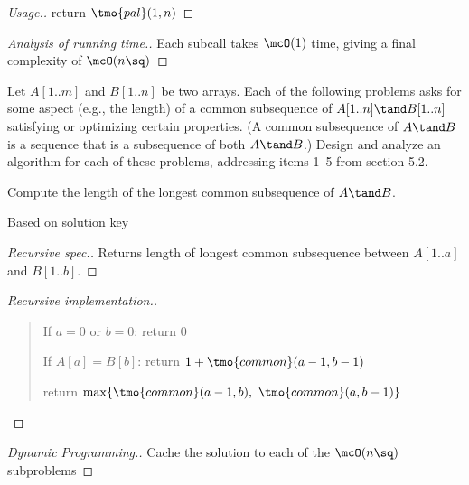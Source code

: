 \documentclass{article}
\begin{document}
\begin{proof}[Usage.]
  return $ \tmo{pal}(1,n) $
\end{proof}

\begin{proof}[Analysis of running time.]
  Each subcall takes $ \mcO(1) $ time, giving a final complexity of $ \mcO(n\sq) $
\end{proof}
\pagebreak

 Let $ A[1..m] $ and $ B[1..n] $ be two arrays. Each of the following problems asks for some aspect (e.g., the length) of a common subsequence of $A[1..n] \tand B[1..n]$ satisfying or optimizing certain properties. (A common subsequence of $A \tand B$ is a sequence that is a subsequence of both $A \tand B$.) Design and analyze an algorithm for each of these problems, addressing items 1--5 from section 5.2.
\setcounter{exercise}{2}
\setcounter{subexercise}{0}

\begin{subexercise} %
  Compute the length of the longest common subsequence of $A \tand B$.
\end{subexercise}

\begin{note}
  Based on solution key
\end{note}

\begin{proof}[Recursive spec.]
  Returns length of longest common subsequence between $ A[1..a] $ and $ B[1..b] $.
\end{proof}

\begin{proof}[Recursive implementation.]\
\begin{quote}
\begin{steps}
  \item If $ a=0 $ or $ b = 0 $: return 0
  \item If $ A[a] = B[b] $: return $ 1+\tmo{common}(a-1,b-1) $
  \item return $ \max \{\tmo{common}(a-1,b),\ \tmo{common}(a,b-1)\}$
\end{steps}
\end{quote}
\end{proof}

\begin{proof}[Dynamic Programming.]
Cache the solution to each of the $ \mcO(n\sq) $ subproblems
\end{proof}
\end{document}
